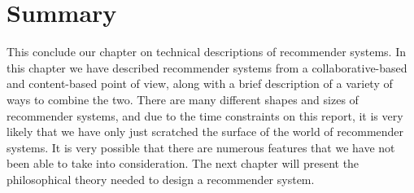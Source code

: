 \section{Summary}

This conclude our chapter on technical descriptions of recommender systems. In this chapter we have described recommender systems from a collaborative-based and content-based point of view, along with a brief description of a variety of ways to combine the two. There are many different shapes and sizes of recommender systems, and due to the time constraints on this report, it is very likely that we have only just scratched the surface of the world of recommender systems. It is very possible that there are numerous features that we have not been able to take into consideration.
The next chapter will present the philosophical theory needed to design a recommender system.

